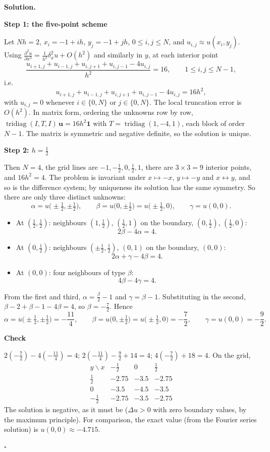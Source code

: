 \documentclass[11pt,a4paper]{article}
\newenvironment{solution}
  {\par\noindent\textbf{Solution.}\par\nobreak}
  {\par\hfill\(\square\)\par}
\newcommand{\step}[1]{\par\addvspace{0.5em}\noindent\textbf{#1}\par\nobreak}
\newcommand{\pdd}[2]{\frac{\partial^2 #1}{\partial #2^2}}
\begin{document}
\begin{solution}
\step{Step 1: the five-point scheme}
Let \(Nh=2\), \(x_i=-1+ih\), \(y_j=-1+jh\), \(0\le i,j\le N\), and
\(u_{i,j}\approx u(x_i,y_j)\).  Using
\(\pdd ux=\frac1{h^2}\delta_x^2u+O(h^2)\) and similarly in \(y\), at each
interior point
\[
  \frac{u_{i+1,j}+u_{i-1,j}+u_{i,j+1}+u_{i,j-1}-4u_{i,j}}{h^2}=16,
  \qquad 1\le i,j\le N-1,
\]
i.e.
\[
  \boxed{\;u_{i+1,j}+u_{i-1,j}+u_{i,j+1}+u_{i,j-1}-4u_{i,j}=16h^2,\;}
\]
with \(u_{i,j}=0\) whenever \(i\in\{0,N\}\) or \(j\in\{0,N\}\).  The
local truncation error is \(O(h^2)\).  In matrix form, ordering the
unknowns row by row,
\(\operatorname{tridiag}(I,T,I)\,\mathbf u=16h^2\mathbf 1\) with
\(T=\operatorname{tridiag}(1,-4,1)\), each block of order \(N-1\).  The
matrix is symmetric and negative definite, so the solution is unique.

\step{Step 2: \(h=\frac12\)}
Then \(N=4\), the grid lines are \(-1,-\frac12,0,\frac12,1\), there are
\(3\times3=9\) interior points, and \(16h^2=4\).  The problem is
invariant under \(x\mapsto-x\), \(y\mapsto-y\) and \(x\leftrightarrow y\),
and so is the difference system; by uniqueness its solution has the
same symmetry.  So there are only three distinct unknowns:
\[
  \alpha=u\bigl(\pm\tfrac12,\pm\tfrac12\bigr),\qquad
  \beta=u\bigl(0,\pm\tfrac12\bigr)=u\bigl(\pm\tfrac12,0\bigr),\qquad
  \gamma=u(0,0).
\]
\begin{itemize}
  \item At \((\frac12,\frac12)\): neighbours \((1,\frac12)\),
    \((\frac12,1)\) on the boundary, \((0,\frac12)\), \((\frac12,0)\):
    \[ 2\beta-4\alpha=4 . \]
  \item At \((0,\frac12)\): neighbours \((\pm\frac12,\frac12)\),
    \((0,1)\) on the boundary, \((0,0)\):
    \[ 2\alpha+\gamma-4\beta=4 . \]
  \item At \((0,0)\): four neighbours of type \(\beta\):
    \[ 4\beta-4\gamma=4 . \]
\end{itemize}
From the first and third, \(\alpha=\frac\beta2-1\) and
\(\gamma=\beta-1\).  Substituting in the second,
\(\beta-2+\beta-1-4\beta=4\), so \(\beta=-\frac72\).  Hence
\[
  \boxed{\alpha=u\bigl(\pm\tfrac12,\pm\tfrac12\bigr)=-\frac{11}4,\qquad
  \beta=u\bigl(0,\pm\tfrac12\bigr)=u\bigl(\pm\tfrac12,0\bigr)=-\frac72,\qquad
  \gamma=u(0,0)=-\frac92 .}
\]

\step{Check}
\(2(-\frac72)-4(-\frac{11}4)=4\);
\(2(-\frac{11}4)-\frac92+14=4\);
\(4(-\frac72)+18=4\).  On the grid,
\[
  \begin{array}{c|ccc}
    y\backslash x&-\frac12&0&\frac12\\\hline
    \frac12&-2.75&-3.5&-2.75\\
    0&-3.5&-4.5&-3.5\\
    -\frac12&-2.75&-3.5&-2.75
  \end{array}
\]
The solution is negative, as it must be (\(\Delta u>0\) with zero
boundary values, by the maximum principle).  For comparison, the exact
value (from the Fourier series solution) is \(u(0,0)\approx-4.715\).
\end{solution}
\end{document}
